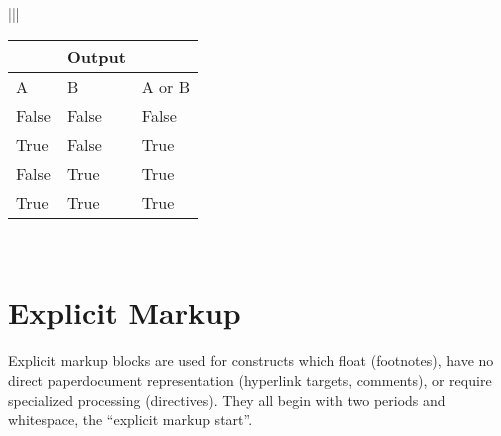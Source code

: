 \documentclass[letterpaper,10pt,english]{sphinxmanual}
\begin{document}
\begin{savenotes}
\begin{tabular}[t]{|*{2}{|}}
\begin{savenotes}\sphinxattablestart
\centering
\begin{tabulary}{\linewidth}[t]{|T|T|T|}
\hline
{}%
%
\sphinxstopmulticolumn
&\sphinxstyletheadfamily 
Output
\\
\hline\sphinxstyletheadfamily 
A
&\sphinxstyletheadfamily 
B
&\sphinxstyletheadfamily 
A or B
\\
\hline
False
&
False
&
False
\\
\hline
True
&
False
&
True
\\
\hline
False
&
True
&
True
\\
\hline
True
&
True
&
True
\\
\hline
\end{tabulary}
\par
\sphinxattableend\end{savenotes}
\\
\hline
\end{tabular}
\par
\sphinxattableend\end{savenotes}


\section{Explicit Markup}
\label{\detokenize{rst-cheatsheet/rst-cheatsheet:explicit-markup}}
Explicit markup blocks are used for constructs which float (footnotes), have no direct paper\sphinxhyphen{}document representation
(hyperlink targets, comments), or require specialized processing (directives).
They all begin with two periods and whitespace, the “explicit markup start”.
\end{document}
